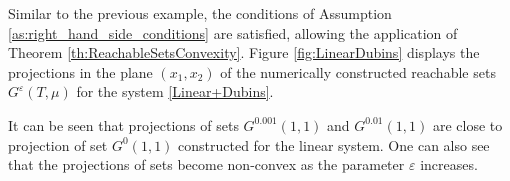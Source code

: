 \documentclass[../main.tex]{subfiles}
\begin{document}
\begin{pr}
	Similar to the previous example, the conditions of Assumption \ref{as:right_hand_side_conditions} are satisfied, allowing the application of Theorem \ref{th:ReachableSetsConvexity}. Figure \ref{fig:LinearDubins} displays the projections in the plane $(x_1,x_2)$ of the numerically constructed reachable sets $G^{\varepsilon}(T,\mu)$ for the system \eqref{Linear+Dubins}. 
	
	It can be seen that projections of sets $G^{0.001}(1,1) $ and $G^{0.01}(1,1) $ are close to projection of set $G^{0}(1,1) $ constructed for the linear system. One can also see that the projections of sets become non-convex as the parameter $\varepsilon$ increases. 
\end{pr}  %
\end{document}
